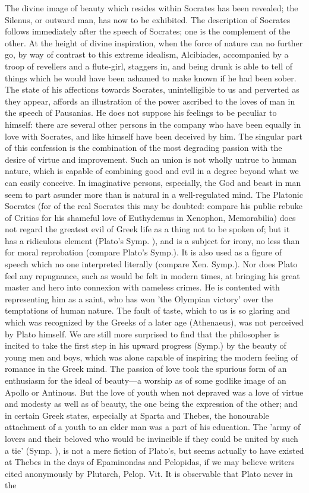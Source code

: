 \documentclass[11pt,letter]{article}
\begin{document}
\par  The divine image of beauty which resides within Socrates has been revealed; the Silenus, or outward man, has now to be exhibited. The description of Socrates follows immediately after the speech of Socrates; one is the complement of the other. At the height of divine inspiration, when the force of nature can no further go, by way of contrast to this extreme idealism, Alcibiades, accompanied by a troop of revellers and a flute-girl, staggers in, and being drunk is able to tell of things which he would have been ashamed to make known if he had been sober. The state of his affections towards Socrates, unintelligible to us and perverted as they appear, affords an illustration of the power ascribed to the loves of man in the speech of Pausanias. He does not suppose his feelings to be peculiar to himself: there are several other persons in the company who have been equally in love with Socrates, and like himself have been deceived by him. The singular part of this confession is the combination of the most degrading passion with the desire of virtue and improvement. Such an union is not wholly untrue to human nature, which is capable of combining good and evil in a degree beyond what we can easily conceive. In imaginative persons, especially, the God and beast in man seem to part asunder more than is natural in a well-regulated mind. The Platonic Socrates (for of the real Socrates this may be doubted: compare his public rebuke of Critias for his shameful love of Euthydemus in Xenophon, Memorabilia) does not regard the greatest evil of Greek life as a thing not to be spoken of; but it has a ridiculous element (Plato's Symp. ), and is a subject for irony, no less than for moral reprobation (compare Plato's Symp.). It is also used as a figure of speech which no one interpreted literally (compare Xen. Symp.). Nor does Plato feel any repugnance, such as would be felt in modern times, at bringing his great master and hero into connexion with nameless crimes. He is contented with representing him as a saint, who has won 'the Olympian victory' over the temptations of human nature. The fault of taste, which to us is so glaring and which was recognized by the Greeks of a later age (Athenaeus), was not perceived by Plato himself. We are still more surprised to find that the philosopher is incited to take the first step in his upward progress (Symp.) by the beauty of young men and boys, which was alone capable of inspiring the modern feeling of romance in the Greek mind. The passion of love took the spurious form of an enthusiasm for the ideal of beauty—a worship as of some godlike image of an Apollo or Antinous. But the love of youth when not depraved was a love of virtue and modesty as well as of beauty, the one being the expression of the other; and in certain Greek states, especially at Sparta and Thebes, the honourable attachment of a youth to an elder man was a part of his education. The 'army of lovers and their beloved who would be invincible if they could be united by such a tie' (Symp. ), is not a mere fiction of Plato's, but seems actually to have existed at Thebes in the days of Epaminondas and Pelopidas, if we may believe writers cited anonymously by Plutarch, Pelop. Vit. It is observable that Plato never in the 
\end{document}
